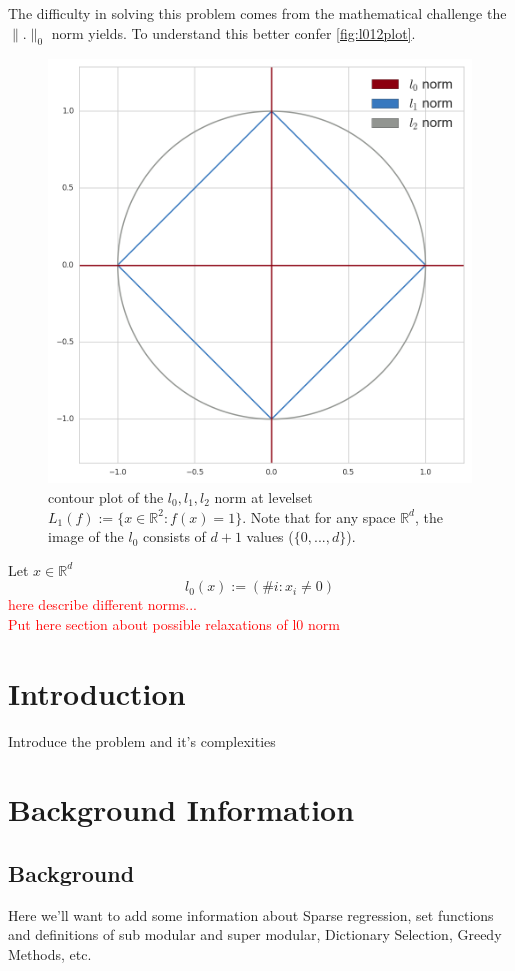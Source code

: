 \documentclass{article}
\newcommand{\R}{\mathbb{R}}
\begin{document}
The difficulty in solving this problem comes from the mathematical challenge the $\| . \|_0$ norm yields. To understand this better confer \autoref{fig:l012plot}.
\begin{figure}
\centering
\includegraphics[scale=0.3]{img/l012_norms.png}
\caption{contour plot of the $l_0, l_1, l_2$ norm at levelset $L_1(f) := \lbrace x \in \R^2 : f(x) = 1 \rbrace $. Note that for any space $\R^d$, the image of the $l_0$ consists of $d+1$ values ($\lbrace 0, ..., d \rbrace $).}
\label{fig:l012plot}
\end{figure}
Let $x \in \R^d$
\[
l_0(x) := (\#i : x_i \not= 0)
\]
\textcolor{red}{here describe different norms...}
\\

\textcolor{red}{Put here section about possible relaxations of l0 norm}

\section{Introduction} \label{introduction}
Introduce the problem and it's complexities

\section{Background Information} \label{background}
\subsection{Background}
Here we'll want to add some information about Sparse regression, set functions and definitions of sub modular and super modular, Dictionary Selection, Greedy Methods, etc.
\end{document}
